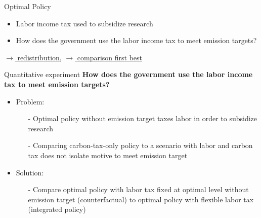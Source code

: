 \documentclass[11pt,aspectratio=169]{beamer}
\newcommand{\ar}{$\Rightarrow$ \ }
\begin{document}
\begin{frame}{Optimal Policy}
\begin{figure}[h!!]
\begin{subfigure}{0.45\textwidth}
			\end{subfigure}
		\end{figure}
		\vspace{3mm}
		\pause
		\begin{block}{}
			\begin{itemize}
				\item Labor income tax used to subsidize research
				\item \alert{How does the government use the labor income tax to meet emission targets?}
			\end{itemize}
		\end{block}	
		\vspace{-5.7mm}
		\hfill
		\hyperlink{Redis}{\tiny{$\rightarrow$ redistribution,}}
\hyperlink{compfb}{\tiny{$\rightarrow$ comparison first best}}
\hypertarget{backOPT}{}
	\end{frame}

	

\begin{frame}{Quantitative experiment}
	\alert{\textbf{How does the government use the labor income tax to meet emission targets?}}
	\pause 
	\begin{itemize}[<+->]
		\item Problem:
		\begin{itemize}
			\item[-] Optimal policy without emission target taxes labor in order to subsidize research
			\item[-] Comparing carbon-tax-only policy to a scenario with labor and carbon tax does not isolate motive to meet emission target %
		\end{itemize}
		\item Solution: 
		\begin{itemize}
			\item[-] Compare optimal policy with labor tax fixed at optimal level without emission target (counterfactual) to optimal policy with flexible labor tax (integrated policy)
		\end{itemize}
	\end{itemize}
\end{frame}
	
\end{document}
